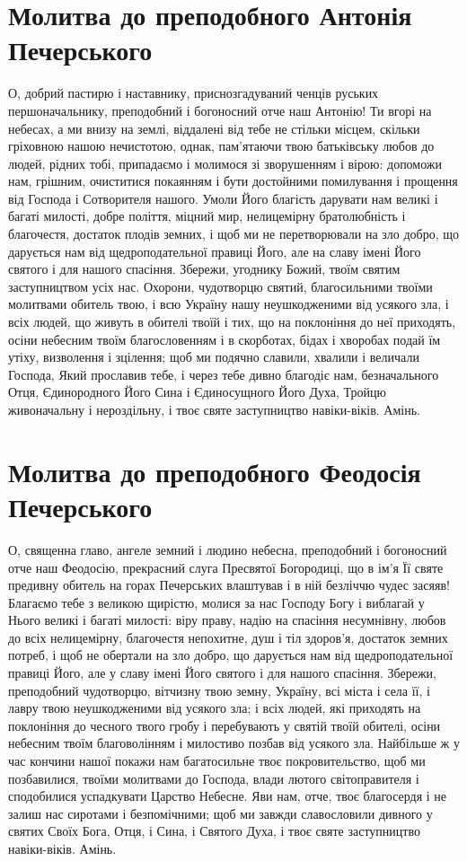 \documentclass[chapters.tex]{subfiles}
\begin{document}
\section{Молитва до преподобного Антонія Печерського}
О, добрий пастирю і наставнику, приснозгадуваний ченців руських першоначальнику, преподобний і богоносний отче наш Антонію! Ти вгорі на небесах, а ми внизу на землі, віддалені від тебе не стільки місцем, скільки гріховною нашою нечистотою, однак, пам’ятаючи твою батьківську любов до людей, рідних тобі, припадаємо і молимося зі зворушенням і вірою: допоможи нам, грішним, очиститися покаянням і бути достойними помилування і прощення від Господа і Сотворителя нашого. Умоли Його благість дарувати нам великі і багаті милості, добре поліття, міцний мир, нелицемірну братолюбність і благочестя, достаток плодів земних, і щоб ми не перетворювали на зло добро, що дарується нам від щедроподательної правиці Його, але на славу імені Його святого і для нашого спасіння. Збережи, угоднику Божий, твоїм святим заступництвом усіх нас. Охорони, чудотворцю святий, благосильними твоїми молитвами обитель твою, і всю Україну нашу неушкодженими від усякого зла, і всіх людей, що живуть в обителі твоїй і тих, що на поклоніння до неї приходять, осіни небесним твоїм благословенням і в скорботах, бідах і хворобах подай їм утіху, визволення і зцілення; щоб ми подячно славили, хвалили і величали Господа, Який прославив тебе, і через тебе дивно благодіє нам, безначального Отця, Єдинородного Його Сина і Єдиносущного Його Духа, Тройцю живоначальну і нероздільну, і твоє святе заступництво навіки-віків. Амінь.

\section{Молитва до преподобного Феодосія Печерського}
О, священна главо, ангеле земний і людино небесна, преподобний і богоносний отче наш Феодосію, прекрасний слуга Пресвятої Богородиці, що в ім’я Її святе предивну обитель на горах Печерських влаштував і в ній безліччю чудес засяяв! Благаємо тебе з великою щирістю, молися за нас Господу Богу і виблагай у Нього великі і багаті милості: віру праву, надію на спасіння несумнівну, любов до всіх нелицемірну, благочестя непохитне, душ і тіл здоров’я, достаток земних потреб, і щоб не обертали на зло добро, що дарується нам від щедроподательної правиці Його, але у славу імені Його святого і для нашого спасіння. Збережи, преподобний чудотворцю, вітчизну твою земну, Україну, всі міста і села її, і лавру твою неушкодженими від усякого зла; і всіх людей, які приходять на поклоніння до чесного твого гробу і перебувають у святій твоїй обителі, осіни небесним твоїм благоволінням і милостиво позбав від усякого зла. Найбільше ж у час кончини нашої покажи нам багатосильне твоє покровительство, щоб ми позбавилися, твоїми молитвами до Господа, влади лютого світоправителя і сподобилися успадкувати Царство Небесне. Яви нам, отче, твоє благосердя і не залиш нас сиротами і безпомічними; щоб ми завжди славословили дивного у святих Своїх Бога, Отця, і Сина, і Святого Духа, і твоє святе заступництво навіки-віків. Амінь.
\end{document}
